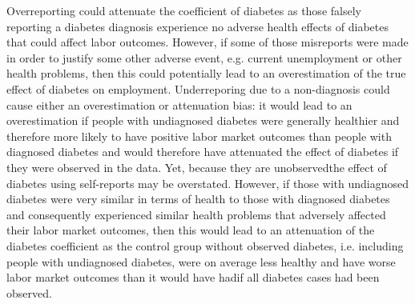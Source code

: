 \documentclass[12pt,english,british]{article}
\providecommand{\DIFaddtex}[1]{{\protect\color{blue}\uwave{#1}}} %
\providecommand{\DIFaddbegin}{} %
\providecommand{\DIFaddend}{} %
\providecommand{\DIFadd}[1]{\texorpdfstring{\DIFaddtex{#1}}{#1}} %
\begin{document}
Overreporting could attenuate the coefficient of diabetes as those falsely reporting a diabetes diagnosis experience no adverse health
effects of diabetes that could affect labor outcomes. However, if some of those misreports were
made in order to justify some other adverse event, e.g. current unemployment
or other health problems, then this could potentially lead to an overestimation
of the true effect of diabetes on employment. Underreporing due to
a non-diagnosis could cause either an overestimation or attenuation
bias: it would lead to an overestimation if people with undiagnosed
diabetes were generally healthier and therefore more likely to have
positive labor market outcomes than people with diagnosed diabetes
and would therefore have attenuated the effect of diabetes if they
were observed in the data. Yet, because they are unobserved\DIFaddbegin \DIFadd{, }\DIFaddend the effect
of diabetes using self-reports may be overstated. However, if those
with undiagnosed diabetes were very similar in terms of health to those with
diagnosed diabetes and consequently experienced similar health problems
that adversely affected their labor market outcomes, then this would lead to an attenuation of the diabetes coefficient as the control group without observed diabetes, i.e. including people with undiagnosed
diabetes, were on average less healthy and have worse labor market outcomes than it
would have had\DIFaddbegin \DIFadd{, }\DIFaddend if all diabetes cases had been observed.
\end{document}
